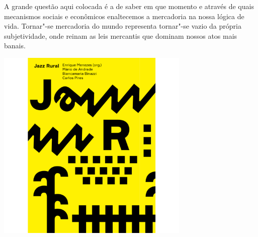 A grande questão aqui colocada é a de saber em que momento e através de quais mecanismos sociais e econômicos enaltecemos a mercadoria na nossa lógica de vida. Tornar"-se mercadoria do mundo representa tornar"-se vazio da própria subjetividade, onde reinam as leis mercantis que dominam nossos atos mais banais. 


\vfill

\hspace*{-.4cm}\begin{minipage}[c]{.5\linewidth}
\small{
{}}
\end{minipage}

\pagebreak



\begin{center}
\hspace*{.5cm}\includegraphics[width=92mm]{./grid/jazz.jpg}
\end{center}

\hspace*{-7cm}\hrulefill\hspace*{-7cm}

